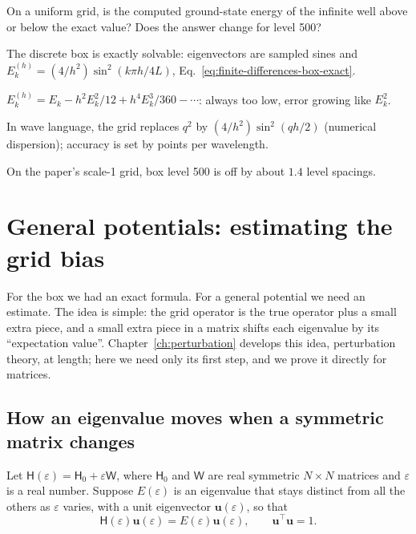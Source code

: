 \begin{checkpoint}
On a uniform grid, is the computed ground-state energy of the infinite well above or below the exact value? Does the answer change for level 500?
\end{checkpoint}

\begin{keyideas}
\item The discrete box is exactly solvable: eigenvectors are sampled sines and $E_k^{(h)}=(4/h^2)\sin^2(k\pi h/4L)$, Eq.~\eqref{eq:finite-differences-box-exact}.
\item $E_k^{(h)}=E_k-h^2E_k^2/12+h^4E_k^3/360-\cdots$: always too low, error growing like $E_k^2$.
\item In wave language, the grid replaces $q^2$ by $(4/h^2)\sin^2(qh/2)$ (numerical dispersion); accuracy is set by points per wavelength.
\item On the paper's scale-1 grid, box level 500 is off by about $1.4$ level spacings.
\end{keyideas}

\section{General potentials: estimating the grid bias}\label{sec:finite-differences-bias}

For the box we had an exact formula. For a general potential we need an estimate. The idea is simple: the grid operator is the true operator plus a small extra piece, and a small extra piece in a matrix shifts each eigenvalue by its ``expectation value''. Chapter~\ref{ch:perturbation} develops this idea, perturbation theory, at length; here we need only its first step, and we prove it directly for matrices.

\subsection{How an eigenvalue moves when a symmetric matrix changes}

Let $\mathsf H(\varepsilon)=\mathsf H_0+\varepsilon\mathsf W$, where $\mathsf H_0$ and $\mathsf W$ are real symmetric $N\times N$ matrices and $\varepsilon$ is a real number. Suppose $E(\varepsilon)$ is an eigenvalue that stays distinct from all the others as $\varepsilon$ varies, with a unit eigenvector $\mathbf u(\varepsilon)$, so that
\begin{equation*}
\mathsf H(\varepsilon)\mathbf u(\varepsilon)=E(\varepsilon)\mathbf u(\varepsilon),\qquad \mathbf u^\top\mathbf u=1.
\end{equation*}

